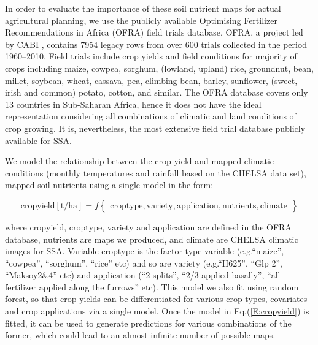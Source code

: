\begin{linenumbers}
In order to evaluate the importance of these soil nutrient maps for actual agricultural planning, we use the publicly available Optimising Fertilizer Recommendations in Africa (OFRA) field trials database. OFRA, a project led by CABI \citep{kaizzi2017fertilizer}, contains 7954 legacy rows from over 600 trials collected in the period 1960--2010. Field trials include crop yields and field conditions for majority of crops including maize, cowpea, sorghum, (lowland, upland) rice, groundnut, bean, millet, soybean, wheat, cassava, pea, climbing bean, barley, sunflower, (sweet, irish and common) potato, cotton, and similar. The OFRA database covers only 13 countries in Sub-Saharan Africa, hence it does not have the ideal representation considering all combinations of climatic and land conditions of crop growing. It is, nevertheless, the most extensive field trial database publicly available for SSA.\par

We model the relationship between the crop yield and mapped climatic conditions (monthly temperatures and rainfall based on the CHELSA data set), mapped soil nutrients using a single model in the form:

\begin{equation} \label{E:cropyield}
\mathrm{cropyield} [\mathrm{t/ha}] = f \begin{Bmatrix} \mathrm{croptype}, \mathrm{variety}, \mathrm{application}, \mathrm{nutrients}, \mathrm{climate} \end{Bmatrix}
\end{equation}

\noindent where $\mathrm{cropyield}$, $\mathrm{croptype}$, $\mathrm{variety}$ and $\mathrm{application}$ are defined in the OFRA database, $\mathrm{nutrients}$ are maps we produced, and $\mathrm{climate}$ are CHELSA climatic images for SSA. Variable $\mathrm{croptype}$ is the factor type variable (e.g.\@ ``maize'', ``cowpea'', ``sorghum'', ``rice'' etc) and so are $\mathrm{variety}$ (e.g.\@ ``H625'', ``Glp 2'', ``Maksoy2\&4'' etc) and $\mathrm{application}$ (``2 splits'', ``2/3 applied basally'', ``all fertilizer applied along the furrows'' etc). This model we also fit using random forest, so that crop yields can be differentiated for various crop types, covariates and crop applications via a single model. Once the model in Eq.(\ref{E:cropyield}) is fitted, it can be used to generate predictions for various combinations of the former, which could lead to an almost infinite number of possible maps.\par 


\end{linenumbers}
